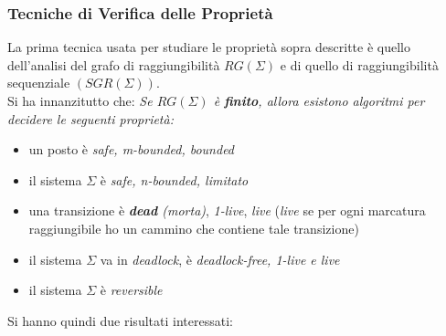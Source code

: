 \documentclass[a4paper,12pt, oneside]{book}
\begin{document}
\subsubsection{Tecniche di Verifica delle Proprietà}
La prima tecnica usata per studiare le proprietà sopra descritte è quello
dell'analisi del grafo di raggiungibilità $RG(\Sigma)$ e di quello di
raggiungibilità sequenziale $(SGR(\Sigma))$.\\
Si ha innanzitutto che:
\textit{Se $RG(\Sigma)$ è\textbf{ finito}, allora esistono algoritmi per
  decidere le seguenti proprietà:}
\begin{itemize}
  \item un posto è \textit{safe, m-bounded, bounded}
  \item il sistema $\Sigma$ è \textit{safe, n-bounded, limitato}
  \item una transizione è \textit{\textbf{dead} (morta)},
  \textit{1-live},\textit{ live} (\textit{live} se per ogni marcatura
  raggiungibile ho un cammino che contiene tale transizione)
  \item il sistema $\Sigma$ va in \textit{deadlock}, è \textit{deadlock-free,
    1-live e live} 
  \item il sistema $\Sigma$ è \textit{reversible}
\end{itemize}
\newpage
Si hanno quindi due risultati interessati:
\end{document}
